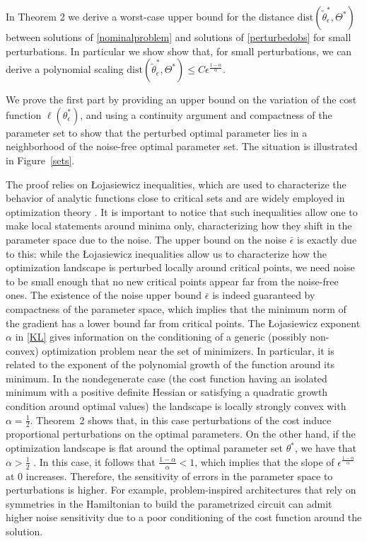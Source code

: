 \documentclass[letterpaper, 10 pt]{IEEEtran}  %
\newcommand{\dist}{\mathrm{dist}}
\begin{document}
In Theorem 2 we derive a worst-case upper bound for the distance $\dist({\tilde{\theta}^*_\epsilon, \Theta^*})$ between solutions of \eqref{nominalproblem} and solutions of \eqref{perturbedobs} for small perturbations. 
In particular we show show that, for small perturbations, we can derive a polynomial scaling 
$\mathrm{dist}({\tilde{\theta}^*_\epsilon, \Theta^*})\le C \epsilon^{\frac{1-\alpha}{\alpha}}$. 

We prove the first part by providing an upper bound on the variation of the cost function $\ell(\theta^*_\epsilon)$,
and using a continuity argument and compactness of the parameter set 
to show that the perturbed optimal parameter lies in a neighborhood of the noise-free optimal parameter set.
The situation is illustrated in Figure~\ref{sets}.

The proof relies on \L{}ojasiewicz inequalities, which are used to characterize the behavior of analytic functions close to critical sets 
and are widely employed in optimization theory \cite{Colding2014}.
It is important to notice that such inequalities allow one to make local statements around minima only, characterizing how they shift in the parameter space due to the noise. The upper bound on the noise $\bar\epsilon$ is exactly due to this: while the \L{}ojasiewicz inequalities
allow us to characterize how the optimization landscape is perturbed locally around critical points, we need noise to be small enough that no new critical points appear far from the noise-free ones. The existence of the noise upper bound $\bar\epsilon$ is indeed guaranteed by compactness of the parameter space, 
which implies that the minimum norm of the gradient has a lower bound far from critical points. 
The \L{}ojasiewicz exponent $\alpha$ in \eqref{KL} gives information on the conditioning of a generic (possibly non-convex) optimization problem near the set of minimizers. In particular, it is related to the exponent of the polynomial growth of the function around its minimum. 
In the nondegenerate case (the cost function having an isolated minimum with a positive definite Hessian or satisfying a quadratic growth condition around optimal values) the landscape is locally strongly convex with $\alpha=\frac{1}{2}$.
Theorem~2 shows that, in this case perturbations of the cost induce proportional perturbations on the optimal parameters.
On the other hand, if the optimization landscape is flat around the optimal parameter set $\theta^*$, we have that $\alpha >\frac{1}{2}$ \cite{Feehan2020}. In this case, it follows that ${\frac{1-\alpha}{\alpha}} <1$, 
which implies that the slope of $\epsilon^{\frac{1-\alpha}{\alpha}}$ at 0 increases. Therefore, the sensitivity of errors in the parameter space to perturbations is higher. 
For example, problem-inspired architectures that rely on symmetries in the Hamiltonian to build the parametrized circuit can admit higher noise sensitivity due to a poor conditioning of the cost function around the solution.   
\end{document}
